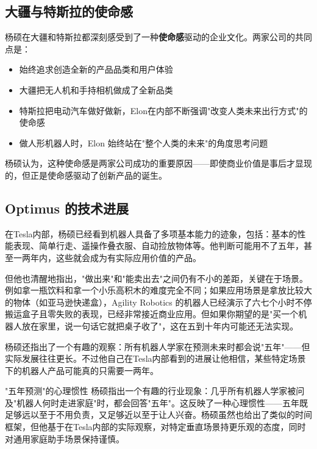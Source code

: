 \documentclass[a4paper]{article}
\begin{document}
\subsection{大疆与特斯拉的使命感}

杨硕在大疆和特斯拉都深刻感受到了一种\textbf{使命感}驱动的企业文化。两家公司的共同点是：

\begin{itemize}
    \item 始终追求创造全新的产品品类和用户体验
    \item 大疆把无人机和手持相机做成了全新品类
    \item 特斯拉把电动汽车做好做新，Elon在内部不断强调"改变人类未来出行方式"的使命感
    \item 做人形机器人时，Elon 始终站在"整个人类的未来"的角度思考问题
\end{itemize}

杨硕认为，这种使命感是两家公司成功的重要原因——即使商业价值是事后才显现的，但正是使命感驱动了创新产品的诞生。

\subsection{Optimus 的技术进展}

在Tesla内部，杨硕已经看到机器人具备了多项基本能力的迹象，包括：基本的性能表现、简单行走、遥操作叠衣服、自动捡放物体等。他判断可能用不了五年，甚至一两年内，这些就会成为有实际应用价值的产品。

但他也清醒地指出，"做出来"和"能卖出去"之间仍有不小的差距，关键在于场景。例如拿一瓶饮料和拿一个小乐高积木的难度完全不同；如果应用场景是拿放比较大的物体（如亚马逊快递盒），Agility Robotics 的机器人已经演示了六七个小时不停搬运盒子且零失败的表现，已经非常接近商业应用。但如果你期望的是"买一个机器人放在家里，说一句话它就把桌子收了"，这在五到十年内可能还无法实现。

杨硕还指出了一个有趣的观察：所有机器人学家在预测未来时都会说"五年"——但实际发展往往更长。不过他自己在Tesla内部看到的进展让他相信，某些特定场景下的机器人产品可能真的只需要一两年。

\begin{knowledgebox}{"五年预测"的心理惯性}
杨硕指出一个有趣的行业现象：几乎所有机器人学家被问及"机器人何时走进家庭"时，都会回答"五年"。这反映了一种心理惯性——五年既足够远以至于不用负责，又足够近以至于让人兴奋。杨硕虽然也给出了类似的时间框架，但他基于在Tesla内部的实际观察，对特定垂直场景持更乐观的态度，同时对通用家庭助手场景保持谨慎。
\end{knowledgebox}
\end{document}
